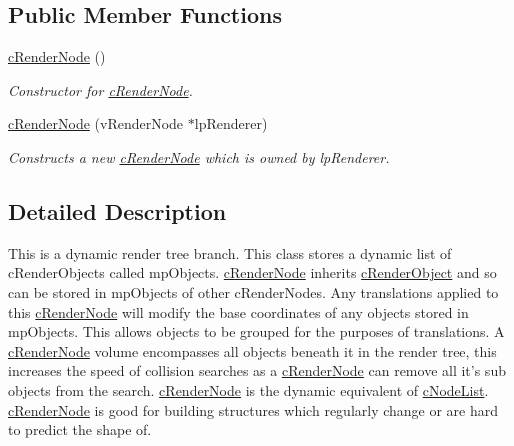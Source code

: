 \subsection*{Public Member Functions}
\begin{DoxyCompactItemize}
\item 
\hypertarget{classc_render_node_aeb068139475cb6af0aa41efc656e331d}{
\hyperlink{classc_render_node_aeb068139475cb6af0aa41efc656e331d}{cRenderNode} ()}
\label{classc_render_node_aeb068139475cb6af0aa41efc656e331d}

\begin{DoxyCompactList}\small\item\em Constructor for \hyperlink{classc_render_node}{cRenderNode}. \end{DoxyCompactList}\item 
\hypertarget{classc_render_node_a488098aa448aecae1524a56795f9512b}{
\hyperlink{classc_render_node_a488098aa448aecae1524a56795f9512b}{cRenderNode} (vRenderNode $\ast$lpRenderer)}
\label{classc_render_node_a488098aa448aecae1524a56795f9512b}

\begin{DoxyCompactList}\small\item\em Constructs a new \hyperlink{classc_render_node}{cRenderNode} which is owned by lpRenderer. \end{DoxyCompactList}\end{DoxyCompactItemize}


\subsection{Detailed Description}
This is a dynamic render tree branch. This class stores a dynamic list of cRenderObjects called mpObjects. \hyperlink{classc_render_node}{cRenderNode} inherits \hyperlink{classc_render_object}{cRenderObject} and so can be stored in mpObjects of other cRenderNodes. Any translations applied to this \hyperlink{classc_render_node}{cRenderNode} will modify the base coordinates of any objects stored in mpObjects. This allows objects to be grouped for the purposes of translations. A \hyperlink{classc_render_node}{cRenderNode} volume encompasses all objects beneath it in the render tree, this increases the speed of collision searches as a \hyperlink{classc_render_node}{cRenderNode} can remove all it's sub objects from the search. \hyperlink{classc_render_node}{cRenderNode} is the dynamic equivalent of \hyperlink{classc_node_list}{cNodeList}. \hyperlink{classc_render_node}{cRenderNode} is good for building structures which regularly change or are hard to predict the shape of. 